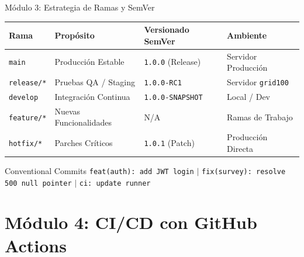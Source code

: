 \documentclass[aspectratio=169,10pt]{beamer}
\begin{document}
\begin{frame}{Módulo 3: Estrategia de Ramas y SemVer}
  \begin{center}
    \begin{tabular}{llll}
      \toprule
      \textbf{Rama} & \textbf{Propósito} & \textbf{Versionado SemVer} & \textbf{Ambiente} \\
      \midrule
      \texttt{main} & Producción Estable & \texttt{1.0.0} (Release) & Servidor Producción \\
      \texttt{release/*} & Pruebas QA / Staging & \texttt{1.0.0-RC1} & Servidor \texttt{grid100} \\
      \texttt{develop} & Integración Continua & \texttt{1.0.0-SNAPSHOT} & Local / Dev \\
      \texttt{feature/*} & Nuevas Funcionalidades & N/A & Ramas de Trabajo \\
      \texttt{hotfix/*} & Parches Críticos & \texttt{1.0.1} (Patch) & Producción Directa \\
      \bottomrule
    \end{tabular}
  \end{center}
  \vspace{0.3cm}
  \begin{alertblock}{Conventional Commits}
    \texttt{feat(auth): add JWT login} \quad $\vert$ \quad \texttt{fix(survey): resolve 500 null pointer} \quad $\vert$ \quad \texttt{ci: update runner}
  \end{alertblock}
\end{frame}

\section{Módulo 4: CI/CD con GitHub Actions}
\end{document}
